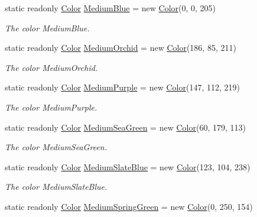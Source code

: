 \begin{DoxyCompactItemize}
static readonly \hyperlink{struct_tri_devs_1_1_tri_engine_1_1_color}{Color} \hyperlink{struct_tri_devs_1_1_tri_engine_1_1_color_ac599378ef86279725706801d862b538a}{Medium\-Blue} = new \hyperlink{struct_tri_devs_1_1_tri_engine_1_1_color}{Color}(0, 0, 205)
\begin{DoxyCompactList}\small\item\em The color Medium\-Blue. \end{DoxyCompactList}\item 
static readonly \hyperlink{struct_tri_devs_1_1_tri_engine_1_1_color}{Color} \hyperlink{struct_tri_devs_1_1_tri_engine_1_1_color_a569acb5b22a6ef225a217cc2221750a1}{Medium\-Orchid} = new \hyperlink{struct_tri_devs_1_1_tri_engine_1_1_color}{Color}(186, 85, 211)
\begin{DoxyCompactList}\small\item\em The color Medium\-Orchid. \end{DoxyCompactList}\item 
static readonly \hyperlink{struct_tri_devs_1_1_tri_engine_1_1_color}{Color} \hyperlink{struct_tri_devs_1_1_tri_engine_1_1_color_a6a90eb3c8e0e3898f428f6ad6fd8b48f}{Medium\-Purple} = new \hyperlink{struct_tri_devs_1_1_tri_engine_1_1_color}{Color}(147, 112, 219)
\begin{DoxyCompactList}\small\item\em The color Medium\-Purple. \end{DoxyCompactList}\item 
static readonly \hyperlink{struct_tri_devs_1_1_tri_engine_1_1_color}{Color} \hyperlink{struct_tri_devs_1_1_tri_engine_1_1_color_ad328abb80abfe4f9ff2a544f9081865a}{Medium\-Sea\-Green} = new \hyperlink{struct_tri_devs_1_1_tri_engine_1_1_color}{Color}(60, 179, 113)
\begin{DoxyCompactList}\small\item\em The color Medium\-Sea\-Green. \end{DoxyCompactList}\item 
static readonly \hyperlink{struct_tri_devs_1_1_tri_engine_1_1_color}{Color} \hyperlink{struct_tri_devs_1_1_tri_engine_1_1_color_a03bb333bde2d78e2abab1ca21ace9dfe}{Medium\-Slate\-Blue} = new \hyperlink{struct_tri_devs_1_1_tri_engine_1_1_color}{Color}(123, 104, 238)
\begin{DoxyCompactList}\small\item\em The color Medium\-Slate\-Blue. \end{DoxyCompactList}\item 
static readonly \hyperlink{struct_tri_devs_1_1_tri_engine_1_1_color}{Color} \hyperlink{struct_tri_devs_1_1_tri_engine_1_1_color_aec2bce9b8cbc0bb272d2244836287639}{Medium\-Spring\-Green} = new \hyperlink{struct_tri_devs_1_1_tri_engine_1_1_color}{Color}(0, 250, 154)

\end{DoxyCompactItemize}
